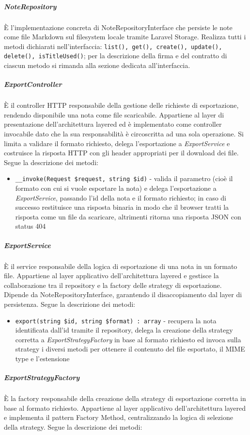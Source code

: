 \documentclass[a4paper,10pt]{article}
\begin{document}
\subparagraph{NoteRepository} È l'implementazione concreta di NoteRepositoryInterface che persiste le note come file Markdown sul filesystem locale tramite Laravel Storage. Realizza tutti i metodi dichiarati nell'interfaccia: \texttt{list(), get(), create(), update(), delete(), isTitleUsed()}; per la descrizione della firma e del contratto di ciascun metodo si rimanda alla sezione dedicata all'interfaccia.
\subparagraph{ExportController} È il controller HTTP responsabile della gestione delle richieste di esportazione, rendendo disponibile una nota come file scaricabile. Appartiene al layer di presentazione dell'architettura layered ed è implementato come controller invocabile dato che la sua responsabilità è circoscritta ad una sola operazione. Si limita a validare il formato richiesto, delega l'esportazione a \textit{ExportService} e costruisce la risposta HTTP con gli header appropriati per il download dei file. Segue la descrizione dei metodi:
\begin{itemize}
    \item \texttt{\_\_invoke(Request \$request, string \$id)} - valida il parametro (cioè il formato con cui si vuole esportare la nota) e delega l'esportazione a \textit{ExportService}, passando l'id della nota e il formato richiesto; in caso di successo restituisce una risposta binaria in modo che il browser tratti la risposta come un file da scaricare, altrimenti ritorna una risposta JSON con status 404
\end{itemize}
\subparagraph{ExportService} È il service responsabile della logica di esportazione di una nota in un formato file. Appartiene al layer applicativo dell'architettura layered e gestisce la collaborazione tra il repository e la factory delle strategy di esportazione. Dipende da NoteRepositoryInterface, garantendo il disaccopiamento dal layer di persistenza. Segue la descrizione dei metodi:
\begin{itemize}
    \item \texttt{export(string \$id, string \$format) : array} - recupera la nota identificata dall'id tramite il repository, delega la creazione della strategy corretta a \textit{ExportStrategyFactory} in base al formato richiesto ed invoca sulla strategy i diversi metodi per ottenere il contenuto del file esportato, il MIME type e l'estensione
\end{itemize}
\subparagraph{ExportStrategyFactory} È la factory responsabile della creazione della strategy di esportazione corretta in base al formato richiesto. Appartiene al layer applicativo dell'architettura layered e implementa il pattern Factory Method, centralizzando la logica di selezione della strategy. Segue la descrizione dei metodi:
\end{document}
